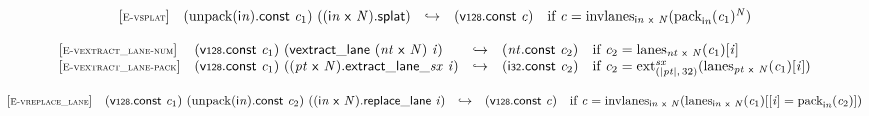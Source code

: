 \vspace{1ex}

$$
\begin{array}{@{}l@{}lcl@{}l@{}}
{[\textsc{\scriptsize E{-}vsplat}]} \quad & ({\mathrm{unpack}}({\mathsf{i}}{{\mathit{n}}}).\mathsf{const}~{\mathit{c}}_{{1}})~(({\mathsf{i}}{{\mathit{n}}}~\mathsf{x}~{\mathit{N}}).\mathsf{splat}) &\hookrightarrow& (\mathsf{v{\scriptstyle128}}.\mathsf{const}~{\mathit{c}}) &\quad
  \mbox{if}~{\mathit{c}} = {{\mathrm{invlanes}}}_{{\mathsf{i}}{{\mathit{n}}}~\mathsf{x}~{\mathit{N}}}({{{\mathrm{pack}}}_{{\mathsf{i}}{{\mathit{n}}}}({\mathit{c}}_{{1}})^{{\mathit{N}}}}) \\
\end{array}
$$

\vspace{1ex}

$$
\begin{array}{@{}l@{}lcl@{}l@{}}
{[\textsc{\scriptsize E{-}vextract\_lane{-}num}]} \quad & (\mathsf{v{\scriptstyle128}}.\mathsf{const}~{\mathit{c}}_{{1}})~(\mathsf{vextract\_lane}~({\mathit{nt}}~\mathsf{x}~{\mathit{N}})~{\mathit{i}}) &\hookrightarrow& ({\mathit{nt}}.\mathsf{const}~{\mathit{c}}_{{2}}) &\quad
  \mbox{if}~{\mathit{c}}_{{2}} = {{\mathrm{lanes}}}_{{\mathit{nt}}~\mathsf{x}~{\mathit{N}}}({\mathit{c}}_{{1}})[{\mathit{i}}] \\
{[\textsc{\scriptsize E{-}vextract\_lane{-}pack}]} \quad & (\mathsf{v{\scriptstyle128}}.\mathsf{const}~{\mathit{c}}_{{1}})~({({\mathit{pt}}~\mathsf{x}~{\mathit{N}}).\mathsf{extract\_lane\_}}{{\mathit{sx}}}~{\mathit{i}}) &\hookrightarrow& (\mathsf{i{\scriptstyle32}}.\mathsf{const}~{\mathit{c}}_{{2}}) &\quad
  \mbox{if}~{\mathit{c}}_{{2}} = {{{{\mathrm{ext}}}_{({|{\mathit{pt}}|},\, 32)}^{{\mathit{sx}}}}}{({{\mathrm{lanes}}}_{{\mathit{pt}}~\mathsf{x}~{\mathit{N}}}({\mathit{c}}_{{1}})[{\mathit{i}}])} \\
\end{array}
$$

\vspace{1ex}

$$
\begin{array}{@{}l@{}lcl@{}l@{}}
{[\textsc{\scriptsize E{-}vreplace\_lane}]} \quad & (\mathsf{v{\scriptstyle128}}.\mathsf{const}~{\mathit{c}}_{{1}})~({\mathrm{unpack}}({\mathsf{i}}{{\mathit{n}}}).\mathsf{const}~{\mathit{c}}_{{2}})~(({\mathsf{i}}{{\mathit{n}}}~\mathsf{x}~{\mathit{N}}).\mathsf{replace\_lane}~{\mathit{i}}) &\hookrightarrow& (\mathsf{v{\scriptstyle128}}.\mathsf{const}~{\mathit{c}}) &\quad
  \mbox{if}~{\mathit{c}} = {{\mathrm{invlanes}}}_{{\mathsf{i}}{{\mathit{n}}}~\mathsf{x}~{\mathit{N}}}({{\mathrm{lanes}}}_{{\mathsf{i}}{{\mathit{n}}}~\mathsf{x}~{\mathit{N}}}({\mathit{c}}_{{1}})[[{\mathit{i}}] = {{\mathrm{pack}}}_{{\mathsf{i}}{{\mathit{n}}}}({\mathit{c}}_{{2}})]) \\
\end{array}
$$

